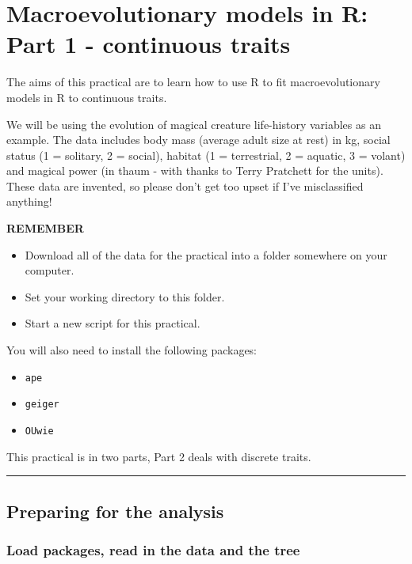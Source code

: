 \documentclass[]{book}
\providecommand{\tightlist}{%
  \setlength{\itemsep}{0pt}\setlength{\parskip}{0pt}}
\theoremstyle{definition}
\theoremstyle{definition}
\theoremstyle{definition}
\theoremstyle{remark}
\begin{document}
\chapter{Macroevolutionary models in R: Part 1 - continuous
traits}\label{macroevolutionary-models-in-r-part-1---continuous-traits}

The aims of this practical are to learn how to use R to fit
macroevolutionary models in R to continuous traits.

We will be using the evolution of magical creature life-history
variables as an example. The data includes body mass (average adult size
at rest) in kg, social status (1 = solitary, 2 = social), habitat (1 =
terrestrial, 2 = aquatic, 3 = volant) and magical power (in thaum - with
thanks to Terry Pratchett for the units). These data are invented, so
please don't get too upset if I've misclassified anything!

\textbf{REMEMBER}

\begin{itemize}
\tightlist
\item
  Download all of the data for the practical into a folder somewhere on
  your computer.
\item
  Set your working directory to this folder.
\item
  Start a new script for this practical.
\end{itemize}

You will also need to install the following packages:

\begin{itemize}
\tightlist
\item
  \texttt{ape}
\item
  \texttt{geiger}
\item
  \texttt{OUwie}
\end{itemize}

This practical is in two parts, Part 2 deals with discrete traits.

\begin{center}\rule{0.5\linewidth}{\linethickness}\end{center}

\section{Preparing for the analysis}\label{preparing-for-the-analysis-1}

\subsection{Load packages, read in the data and the
tree}\label{load-packages-read-in-the-data-and-the-tree}
\end{document}
